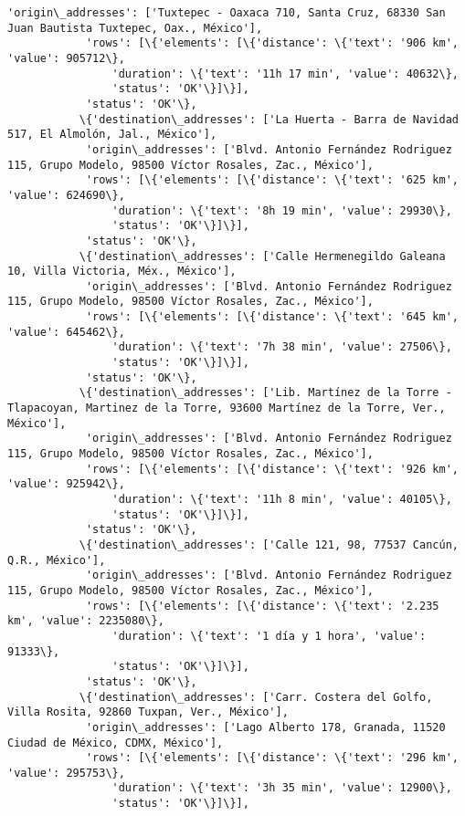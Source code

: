 \documentclass[11pt]{article}
\begin{document}
\begin{Verbatim}[commandchars=\\\{\}]
            'origin\_addresses': ['Tuxtepec - Oaxaca 710, Santa Cruz, 68330 San Juan Bautista Tuxtepec, Oax., México'],
            'rows': [\{'elements': [\{'distance': \{'text': '906 km', 'value': 905712\},
                'duration': \{'text': '11h 17 min', 'value': 40632\},
                'status': 'OK'\}]\}],
            'status': 'OK'\},
           \{'destination\_addresses': ['La Huerta - Barra de Navidad 517, El Almolón, Jal., México'],
            'origin\_addresses': ['Blvd. Antonio Fernández Rodriguez 115, Grupo Modelo, 98500 Víctor Rosales, Zac., México'],
            'rows': [\{'elements': [\{'distance': \{'text': '625 km', 'value': 624690\},
                'duration': \{'text': '8h 19 min', 'value': 29930\},
                'status': 'OK'\}]\}],
            'status': 'OK'\},
           \{'destination\_addresses': ['Calle Hermenegildo Galeana 10, Villa Victoria, Méx., México'],
            'origin\_addresses': ['Blvd. Antonio Fernández Rodriguez 115, Grupo Modelo, 98500 Víctor Rosales, Zac., México'],
            'rows': [\{'elements': [\{'distance': \{'text': '645 km', 'value': 645462\},
                'duration': \{'text': '7h 38 min', 'value': 27506\},
                'status': 'OK'\}]\}],
            'status': 'OK'\},
           \{'destination\_addresses': ['Lib. Martínez de la Torre - Tlapacoyan, Martinez de la Torre, 93600 Martínez de la Torre, Ver., México'],
            'origin\_addresses': ['Blvd. Antonio Fernández Rodriguez 115, Grupo Modelo, 98500 Víctor Rosales, Zac., México'],
            'rows': [\{'elements': [\{'distance': \{'text': '926 km', 'value': 925942\},
                'duration': \{'text': '11h 8 min', 'value': 40105\},
                'status': 'OK'\}]\}],
            'status': 'OK'\},
           \{'destination\_addresses': ['Calle 121, 98, 77537 Cancún, Q.R., México'],
            'origin\_addresses': ['Blvd. Antonio Fernández Rodriguez 115, Grupo Modelo, 98500 Víctor Rosales, Zac., México'],
            'rows': [\{'elements': [\{'distance': \{'text': '2.235 km', 'value': 2235080\},
                'duration': \{'text': '1 día y 1 hora', 'value': 91333\},
                'status': 'OK'\}]\}],
            'status': 'OK'\},
           \{'destination\_addresses': ['Carr. Costera del Golfo, Villa Rosita, 92860 Tuxpan, Ver., México'],
            'origin\_addresses': ['Lago Alberto 178, Granada, 11520 Ciudad de México, CDMX, México'],
            'rows': [\{'elements': [\{'distance': \{'text': '296 km', 'value': 295753\},
                'duration': \{'text': '3h 35 min', 'value': 12900\},
                'status': 'OK'\}]\}],

\end{Verbatim}
\end{document}
